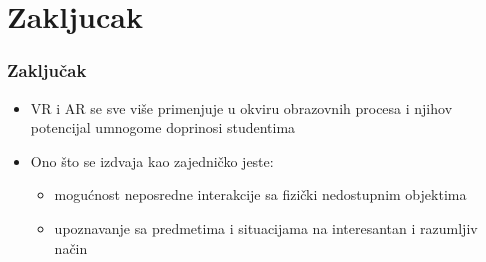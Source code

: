 \documentclass[9pt]{beamer}
\begin{document}
\section{Zakljucak}

\begin{frame}[fragile]\frametitle{Zaključak}
	
		\begin{itemize}
  \setlength\itemsep{1.5em}
			\item VR i AR se sve više primenjuje u okviru obrazovnih procesa i njihov potencijal umnogome doprinosi studentima
			\item Ono što se izdvaja kao zajedničko jeste:
   
   \begin{itemize}
   \item mogućnost neposredne interakcije sa fizički nedostupnim objektima 
    \item upoznavanje sa predmetima i situacijama na interesantan i razumljiv način
   
\end{itemize}

  
		\end{itemize}

\end{frame}
\end{document}
